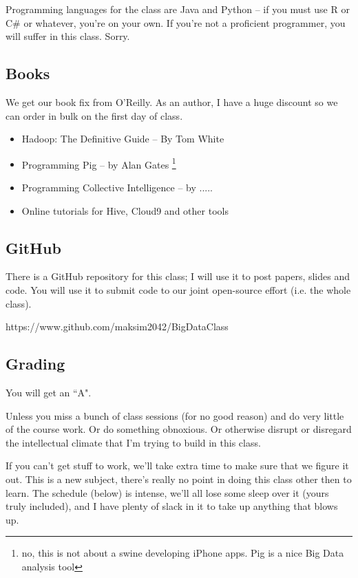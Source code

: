 \documentclass[12pt]{article}
\begin{document}
Programming languages for the class are Java and Python -- if you must use R or C\# or whatever, you're on your own. If you're not a proficient programmer, you will suffer in this class. Sorry.

\subsection{Books}

We get our book fix from O'Reilly. As an author, I have a huge discount so we can order in bulk on the first day of class.

\begin{itemize}
\item Hadoop: The Definitive Guide -- By Tom White
\item Programming Pig -- by Alan Gates \footnote{no, this is not about a swine developing iPhone apps. Pig is a nice Big Data analysis tool}
\item Programming Collective Intelligence -- by .....
\item Online tutorials for Hive, Cloud9 and other tools

\end{itemize}

\subsection{GitHub}

There is a GitHub repository for this class; I will use it to post papers, slides and code. You will use it to submit code to our joint open-source effort (i.e. the whole class). 

https://www.github.com/maksim2042/BigDataClass

\subsection{Grading}

You will get an ``A". 

Unless you miss a bunch of class sessions (for no good reason) and do very little of the course work. Or do something obnoxious. Or otherwise disrupt or disregard the intellectual climate that I'm trying to build in this class. 

If you can't get stuff to work, we'll take extra time to make sure that we figure it out. This is a new subject, there's really no point in doing this class other then to learn. The schedule (below) is intense, we'll all lose some sleep over it (yours truly included), and I have plenty of slack in it to take up anything that blows up. 
\end{document}

